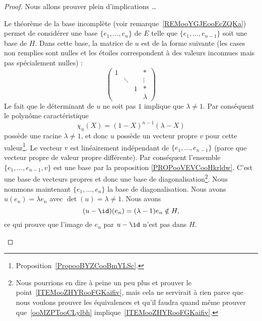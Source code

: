 \begin{proof}
	Nous allons prouver plein d'implications \ldots
	\begin{subproof}
		Le théorème de la base incomplète (voir remarque~\ref{REMooYGJEooEcZQKa}) permet de considérer une base \( \{ e_1,\ldots, e_n \}\) de \( E\) telle que \( \{ e_1,\ldots, e_{n-1} \} \) soit une base de \( H\). Dans cette base, la matrice de \( u\) est de la forme suivante (les cases non remplies sont nulles et les étoiles correspondent à des valeurs inconnues mais pas spécialement nulles) :
		\begin{equation}        \label{EqooPQOEooGUyIwa}
			\begin{pmatrix}
				1 &        &   & *       \\
				  & \ddots &   & \vdots  \\
				  &        & 1 & *       \\
				  &        &   & \lambda
			\end{pmatrix}
		\end{equation}
		Le fait que le déterminant de \( u\) ne soit pas \( 1\) implique que \( \lambda\neq 1\). Par conséquent le polynôme caractéristique
		\begin{equation}
			\chi_u(X)=(1-X)^{n-1}(\lambda-X)
		\end{equation}
		possède une racine \( \lambda\neq 1\), et donc \( u\) possède un vecteur propre \( v\) pour cette valeur\footnote{Proposition~\ref{PropooBYZCooBmYLSc}.}. Le vecteur \( v\) est linéairement indépendant de \( \{ e_1,\ldots, e_{n-1} \}\) (parce que vecteur propre de valeur propre différente). Par conséquent l'ensemble \( \{ e_1,\ldots, e_{n-1},v \}\) est une base par la proposition \ref{PROPooVEVCooHkrldw}. C'est une base de vecteurs propres et donc une base de diagonalisation\footnote{Nous pourrions en dire à peine un peu plus et prouver le point~\ref{ITEMooZHYRooFGKaifiv}, mais cela ne servirait à rien parce que nous voulons prouver les équivalences et qu'il faudra quand même prouver que~\ref{ooMZPTooCLylbh} implique~\ref{ITEMooZHYRooFGKaifiv}.}.
		Nous nommons maintenant \( \{ e_1,\ldots, e_{n} \}\) la base de diagonalisation. Nous avons \( u(e_n)=\lambda e_n\) avec \( \det(u)=\lambda\neq 1\). Nous avons
		\begin{equation}
			(u-\id)(e_n)=(\lambda-1)e_n\notin H,
		\end{equation}
		ce qui prouve que l'image de \( e_n\) par \( u-\id\) n'est pas dans \( H\).

\end{subproof}
\end{proof}
